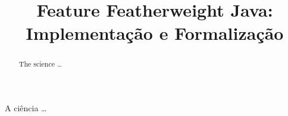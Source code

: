 \documentclass[bacharelado]{unb-cic}
\title{Feature Featherweight Java: Implementação e Formalização}
\begin{document}
  \maketitle
  \pretextual



  \begin{resumo}
  A ciência \dots
  \end{resumo}

  \begin{abstract}
  The science \dots
  \end{abstract}

  \tableofcontents
  \listoffigures
  \listoftables

  \textual
  
  

  \postextual
  
  
\end{document}
